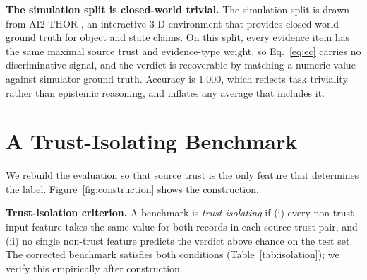 \documentclass[11pt]{article}
\begin{document}
\textbf{The simulation split is closed-world trivial.} The simulation split is drawn from AI2-THOR \citep{kolve2017ai2thor}, an interactive 3-D environment that provides closed-world ground truth for object and state claims. On this split, every evidence item has the same maximal source trust and evidence-type weight, so Eq.~\eqref{eq:ec} carries no discriminative signal, and the verdict is recoverable by matching a numeric value against simulator ground truth. Accuracy is 1.000, which reflects task triviality rather than epistemic reasoning, and inflates any average that includes it.

\begin{table}[t]
\caption{Diagnosis of the original evaluation. Each row reports a number that undercuts a source-trust claim. Lookup values are the fraction of verdicts recovered from a single non-trust feature.}
\label{tab:diagnosis}
\centering
{}
\end{table}

\section{A Trust-Isolating Benchmark}
\label{sec:benchmark}
We rebuild the evaluation so that source trust is the only feature that determines the label. Figure~\ref{fig:construction} shows the construction.

\textbf{Trust-isolation criterion.} A benchmark is \emph{trust-isolating} if (i) every non-trust input feature takes the same value for both records in each source-trust pair, and (ii) no single non-trust feature predicts the verdict above chance on the test set. The corrected benchmark satisfies both conditions (Table~\ref{tab:isolation}); we verify this empirically after construction.
\end{document}
